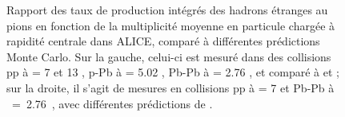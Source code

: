 \begin{figure}[!p]
\hspace*{-1.25cm}
\caption{Rapport des taux de production intégrés des hadrons étranges au pions en fonction de la multiplicité moyenne en particule chargée à rapidité centrale dans ALICE, comparé à différentes prédictions Monte Carlo. Sur la gauche, celui-ci est mesuré dans des collisions pp à \sqrtS = 7 et 13 \tev, p-Pb à \sqrtSnn = 5.02 \tev, Pb-Pb à \sqrtSnn = 2.76 \tev , et comparé à \Pythiaeight et \Herwig \cite{acharyaMultiplicityDependencePi2020} ; sur la droite, il s'agit de mesures en collisions pp à \sqrtS = 7 \tev et Pb-Pb à \sqrtSnn~=~2.76~\tev, avec différentes prédictions de \Epos \cite{wernerCorecoronaProcedureMicrocanonical2023}.}
	\label{fig:MCModelStrangenessEnhancement}
\end{figure}

